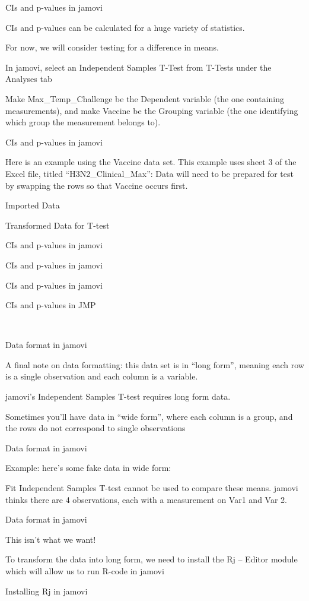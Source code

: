\documentclass[
  letterpaper,
  DIV=11,
  numbers=noendperiod]{scrreprt}
\begin{document}
CIs and p-values in jamovi

CIs and p-values can be calculated for a huge variety of statistics.

For now, we will consider testing for a difference in means.

In jamovi, select an Independent Samples T-Test from T-Tests under the
Analyses tab

Make Max\_Temp\_Challenge be the Dependent variable (the one containing
measurements), and make Vaccine be the Grouping variable (the one
identifying which group the measurement belongs to).

CIs and p-values in jamovi

Here is an example using the Vaccine data set. This example uses sheet 3
of the Excel file, titled ``H3N2\_Clinical\_Max'': Data will need to be
prepared for test by swapping the rows so that Vaccine occurs first.

Imported Data

Transformed Data for T-test

CIs and p-values in jamovi

CIs and p-values in jamovi

CIs and p-values in jamovi

CIs and p-values in JMP

~

Data format in jamovi

A final note on data formatting: this data set is in ``long form'',
meaning each row is a single observation and each column is a variable.

jamovi's Independent Samples T-test requires long form data.

Sometimes you'll have data in ``wide form'', where each column is a
group, and the rows do not correspond to single observations

Data format in jamovi

Example: here's some fake data in wide form:

Fit Independent Samples T-test cannot be used to compare these means.
jamovi thinks there are 4 observations, each with a measurement on Var1
and Var 2.

Data format in jamovi

This isn't what we want!

To transform the data into long form, we need to install the Rj --
Editor module which will allow us to run R-code in jamovi

Installing Rj in jamovi
\end{document}
